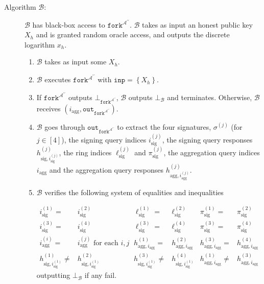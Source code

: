 \documentclass{mrl}
\theoremstyle{definition}
\numberwithin{theorem}{subsection}
\newcommand{\adversary}{\mathcal{A}}
\begin{document}
\begin{description}
\item [Algorithm $\mathcal{B}$:] $\mathcal{B}$ has black-box access to $\texttt{fork}^{\adversary^{\prime \prime}}$. $\mathcal{B}$ takes as input an honest public key $X_h$ and is granted random oracle access, and outputs the discrete logarithm $x_h$.
\begin{enumerate}
\item $\mathcal{B}$ takes as input some $X_h$.

\item $\mathcal{B}$ executes $\texttt{fork}^{\adversary^{\prime \prime}}$ with $\texttt{inp} = \left\{X_h\right\}$.

\item If $\texttt{fork}^{\adversary^{\prime \prime}}$ outputs $\bot_{\texttt{fork}^{\adversary^{\prime \prime}}}$, $\mathcal{B}$ outputs $\bot_{\mathcal{B}}$ and terminates. Otherwise, $\mathcal{B}$ receives $(i_{\text{agg}}, \texttt{out}_{\texttt{fork}^{\adversary^{\prime \prime}}})$. 

\item $\mathcal{B}$ goes through $\texttt{out}_{\texttt{fork}^{\adversary^{\prime \prime}}}$ to extract the four signatures, $\sigma^{(j)}$ (for $j \in [4]$), the signing query indices $i_{\text{sig}}^{(j)}$, the signing query responses $h_{\text{sig}, i_{\text{sig}}^{(j)}}^{(j)}$, the ring indices $\ell_{\text{sig}}^{(j)}$ and $\pi_{\text{sig}}^{(j)}$, the aggregation query indices $i_{\text{agg}}$ and the aggregation query responses $h_{\text{agg}, i_{\text{agg}}^{(j)}}^{(j)}$.

\item $\mathcal{B}$ verifies the following system of equalities and inequalities

\begin{align*}
i_{\text{sig}}^{(1)} =& i_{\text{sig}}^{(2)} & \ell_{\text{sig}}^{(1)} =& \ell_{\text{sig}}^{(2)} &  \pi_{\text{sig}}^{(1)} =& \pi_{\text{sig}}^{(2)} \\ i_{\text{sig}}^{(3)} =& i_{\text{sig}}^{(4)} &  \ell_{\text{sig}}^{(3)} =& \ell_{\text{sig}}^{(4)} &  \pi_{\text{sig}}^{(3)} =& \pi_{\text{sig}}^{(4)} \\
i_{\text{agg}}^{(i)} =&  i_{\text{agg}}^{(j)}\text{ for each }i, j & 
h_{\text{agg}, i_{\text{agg}}}^{(1)} =& h_{\text{agg}, i_{\text{agg}}}^{(2)} &
h_{\text{agg}, i_{\text{agg}}}^{(3)} =& h_{\text{agg}, i_{\text{agg}}}^{(4)}\\
h_{\text{sig}, i_{\text{sig}}^{(1)}}^{(1)} \neq&  h_{\text{sig}, i_{\text{sig}}^{(1)}}^{(2)} & h_{\text{sig}, i_{\text{sig}}^{(1)}}^{(3)} \neq&  h_{\text{sig}, i_{\text{sig}}^{(1)}}^{(4)} & h_{\text{agg}, i_{\text{agg}}}^{(1)} \neq& h_{\text{agg}, i_{\text{agg}}}^{(3)}
\end{align*} outputting $\bot_\mathcal{B}$ if any fail.


\end{enumerate}
\end{description}
\end{document}

